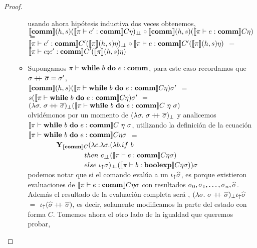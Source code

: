 \begin{proof}
\begin{itemize}
\begin{itemize}
usando ahora hip\'otesis inductiva dos veces obtenemos,\\

$\llbracket \textbf{comm} \rrbracket(h,s)(\llbracket \pi \vdash e' : \textbf{comm} \rrbracket C\eta)_{\bot \!\!\! \bot} 
	\circ
 \llbracket \textbf{comm} \rrbracket(h,s)(\llbracket \pi \vdash e : \textbf{comm} \rrbracket C\eta)$ $=$\\
$\llbracket \pi \vdash e' : \textbf{comm} \rrbracket C'(\llbracket \pi \rrbracket(h,s)\eta)_{\bot \!\!\! \bot}
	\circ
\llbracket \pi \vdash e : \textbf{comm} \rrbracket C'(\llbracket \pi \rrbracket(h,s)\eta)$ $=$\\
$\llbracket \pi \vdash e \textbf{;} e' : \textbf{comm} \rrbracket C'(\llbracket \pi \rrbracket(h,s)\eta)$\\

\item Supongamos $\pi \vdash \textbf{while} \ b \ \textbf{do} \ e : \textbf{comm}$, para este caso
recordamos que $\sigma +\kern-1.3ex+\kern0.8ex \overline{\sigma} = \sigma'$,\\

$\llbracket \textbf{comm} \rrbracket(h,s)(\llbracket \pi \vdash \textbf{while} \ b \ \textbf{do} \ e : \textbf{comm} \rrbracket C\eta)\sigma'$ $=$\\
$s(\llbracket \pi \vdash \textbf{while} \ b \ \textbf{do} \ e : \textbf{comm} \rrbracket C\eta)\sigma'$ $=$\\
$(\lambda \sigma. \ \sigma +\kern-1.3ex+\kern0.8ex \overline{\sigma})_{\bot}
				(\llbracket \pi \vdash \textbf{while} \ b \ \textbf{do} \ e : \textbf{comm} \rrbracket C \ \eta \ \sigma)$\\

olvid\'emonos por un momento de $(\lambda \sigma. \ \sigma +\kern-1.3ex+\kern0.8ex \overline{\sigma})_{\bot}$
y analicemos $\semBrcks{\pi \vdash \cwhiledo{b}{e} : \commt}C \ \eta \ \sigma$, utilizando
la definici\'on de la ecuaci\'on\\

$\llbracket \pi \vdash \textbf{while} \ b \ \textbf{do} \ e : \textbf{comm} \rrbracket C \eta \sigma$ $=$ \\
\indent \ \ \ \ \ \ \ \
$\textbf{Y}_{\llbracket \textbf{comm} \rrbracket C} (\lambda c . \lambda \sigma . (\lambda b . if \ b$ \\
\indent \ \ \ \ \ \ \ \ \ \ \ \ \ \ \ \
$then \ c_{\dbot}(\semBrcks{\pi \vdash e : \commt}C \eta \sigma)$ \\
\indent \ \ \ \ \ \ \ \ \ \ \ \ \ \ \ \
$else \ \iota_{\uparrow} \sigma)_{\bot \!\!\! \bot} (\llbracket \pi \vdash b : \textbf{boolexp} \rrbracket C\eta\sigma))\sigma$ \\

podemos notar que si el comando eval\'ua a un $\iota_{\uparrow}\widehat{\sigma}$, es porque 
existieron evaluaciones de $\llbracket \pi \vdash e : \textbf{comm} \rrbracket C \eta \sigma$
con resultados $\sigma_0, \sigma_1, \ldots, \sigma_n, \widehat{\sigma}$. Adem\'as 
el resultado de la evaluaci\'on completa ser\'a ,
$(\lambda \sigma. \ \sigma +\kern-1.3ex+\kern0.8ex \overline{\sigma})_{\bot} \iota_{\uparrow} \widehat{\sigma}$ $=$
$\iota_{\uparrow} (\widehat{\sigma} +\kern-1.3ex+\kern0.8ex \overline{\sigma})$, es decir, solamente modificamos la parte del estado
con forma $C$. Tomemos ahora el otro lado de la igualdad que queremos probar,\\


\end{itemize}
\end{itemize}
\end{proof}
